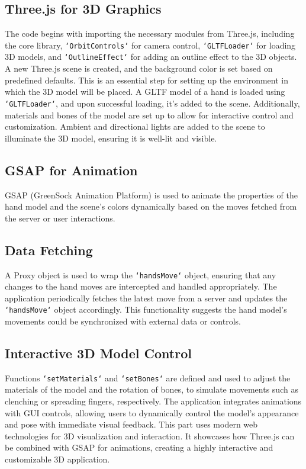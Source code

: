 \documentclass[11pt,a4paper]{report}
\begin{document}
\subsection*{Three.js for 3D Graphics}
The code begins with importing the necessary modules from Three.js, including the core library, \texttt{`OrbitControls`} for camera control, \texttt{`GLTFLoader`} for loading 3D models, and \texttt{`OutlineEffect`} for adding an outline effect to the 3D objects.
A new Three.js scene is created, and the background color is set based on predefined defaults. This is an essential step for setting up the environment in which the 3D model will be placed.
A GLTF model of a hand is loaded using \texttt{`GLTFLoader`}, and upon successful loading, it's added to the scene. Additionally, materials and bones of the model are set up to allow for interactive control and customization.
Ambient and directional lights are added to the scene to illuminate the 3D model, ensuring it is well-lit and visible.

\subsection*{GSAP for Animation}
GSAP (GreenSock Animation Platform) is used to animate the properties of the hand model and the scene's colors dynamically based on the moves fetched from the server or user interactions.

\subsection*{Data Fetching}
A Proxy object is used to wrap the \texttt{`handsMove`} object, ensuring that any changes to the hand moves are intercepted and handled appropriately.
The application periodically fetches the latest move from a server and updates the \texttt{`handsMove`} object accordingly. This functionality suggests the hand model's movements could be synchronized with external data or controls.

\subsection*{Interactive 3D Model Control}
Functions \texttt{`setMaterials`} and \texttt{`setBones`} are defined and used to adjust the materials of the model and the rotation of bones, to simulate movements such as clenching or spreading fingers, respectively.
The application integrates animations with GUI controls, allowing users to dynamically control the model's appearance and pose with immediate visual feedback.
This part uses modern web technologies for 3D visualization and interaction. It showcases how Three.js can be combined with GSAP for animations, creating a highly interactive and customizable 3D application. 
\end{document}
